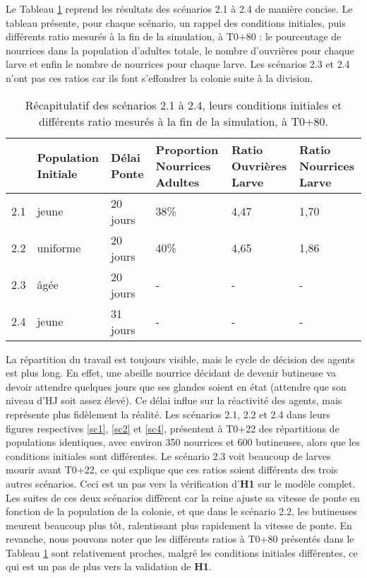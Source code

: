 		Le Tableau \ref{TabComplet} reprend les résultats des scénarios 2.1 à 2.4 de manière concise. Le tableau présente, pour chaque scénario, un rappel des conditions initiales, puis différents ratio mesurés à la fin de la simulation, à T0+80 : le pourcentage de nourrices dans la population d'adultes totale, le nombre d'ouvrières pour chaque larve et enfin le nombre de nourrices pour chaque larve. Les scénarios 2.3 et 2.4 n'ont pas ces ratios car ils font s'effondrer la colonie suite à la division.
		\begin{table}
		\centering
		\begin{tabularx}{\textwidth}{l|p{2cm}|p{1.5cm}|X|X|X}
    	& Population \newline Initiale & Délai Ponte & Proportion Nourrices Adultes & Ratio Ouvrières Larve & Ratio Nourrices Larve \\
   		\hline
   		2.1 & jeune & 20 jours & 38\% & 4,47 & 1,70 \\
   		2.2 & uniforme & 20 jours & 40\% & 4,65 & 1,86 \\
   		2.3 & âgée & 20 jours &-&-&-\\
   		2.4 & jeune & 31 jours &-&-&-\\
		\end{tabularx}	
		\caption{Récapitulatif des scénarios 2.1 à 2.4, leurs conditions initiales et différents ratio mesurés à la fin de la simulation, à T0+80.}	
   		\label{TabComplet}
	\end{table}	
		
		
		La répartition du travail est toujours visible, mais le cycle de décision des agents est plus long. En effet, une abeille nourrice décidant de devenir butineuse va devoir attendre quelques jours que ses glandes soient en état (attendre que son niveau d'HJ soit assez élevé). Ce délai influe sur la réactivité des agents, mais représente plus fidèlement la réalité. Les scénarios 2.1, 2.2 et 2.4 dans leurs figures respectives \ref{sc1}, \ref{sc2} et \ref{sc4}, présentent à T0+22 des répartitions de populations identiques, avec environ 350 nourrices et 600 butineuses, alors que les conditions initiales sont différentes. Le scénario 2.3 voit beaucoup de larves mourir avant T0+22, ce qui explique que ces ratios soient différents des trois autres scénarios. Ceci est un pas vers la vérification d'\textbf{H1} sur le modèle complet. Les suites de ces deux scénarios diffèrent car la reine ajuste sa vitesse de ponte en fonction de la population de la colonie, et que dans le scénario 2.2, les butineuses meurent beaucoup plus tôt, ralentissant plus rapidement la vitesse de ponte. En revanche, nous pouvons noter que les différents ratios à T0+80 présentés dans le Tableau \ref{TabComplet} sont relativement proches, malgré les conditions initiales différentes, ce qui est un pas de plus vers la validation de \textbf{H1}.
		
